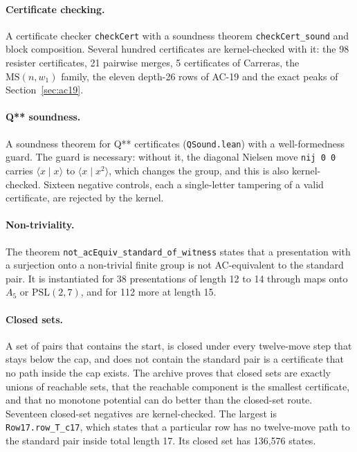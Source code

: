 \documentclass[11pt,a4paper]{article}
\theoremstyle{definition}
\newcommand{\MS}{\mathrm{MS}}
\begin{document}
\paragraph{Certificate checking.} A certificate checker \texttt{checkCert} with a soundness theorem \texttt{checkCert\_sound} and block composition. Several hundred certificates are kernel-checked with it: the 98 resister certificates, 21 pairwise merges, 5 certificates of Carreras, the $\MS(n,w_1)$ family, the eleven depth-26 rows of AC-19 and the exact peaks of Section~\ref{sec:ac19}.

\paragraph{Q** soundness.} A soundness theorem for Q** certificates (\texttt{QSound.lean}) with a well-formedness guard. The guard is necessary: without it, the diagonal Nielsen move \texttt{nij 0 0} carries $\langle x\mid x\rangle$ to $\langle x\mid x^2\rangle$, which changes the group, and this is also kernel-checked. Sixteen negative controls, each a single-letter tampering of a valid certificate, are rejected by the kernel.

\paragraph{Non-triviality.} The theorem \texttt{not\_acEquiv\_standard\_of\_witness} states that a presentation with a surjection onto a non-trivial finite group is not AC-equivalent to the standard pair. It is instantiated for 38 presentations of length 12 to 14 through maps onto $A_5$ or $\mathrm{PSL}(2,7)$, and for 112 more at length 15.

\paragraph{Closed sets.} A set of pairs that contains the start, is closed under every twelve-move step that stays below the cap, and does not contain the standard pair is a certificate that no path inside the cap exists. The archive proves that closed sets are exactly unions of reachable sets, that the reachable component is the smallest certificate, and that no monotone potential can do better than the closed-set route. Seventeen closed-set negatives are kernel-checked. The largest is \texttt{Row17.row\_T\_c17}, which states that a particular row has no twelve-move path to the standard pair inside total length 17. Its closed set has 136,576 states.
\end{document}

